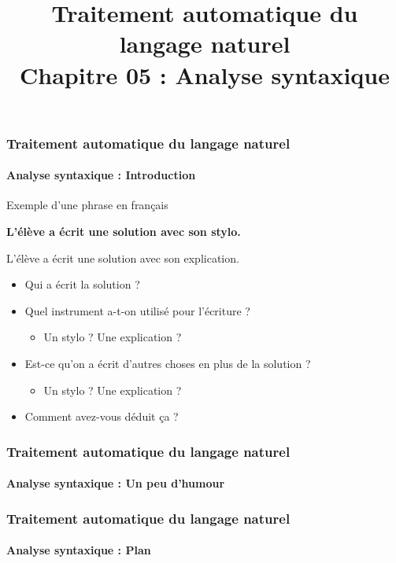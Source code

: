 \documentclass[xcolor=table]{beamer}
\title[TALN : 05- Analyse syntaxique]%
{Traitement automatique du langage naturel\\Chapitre 05 : Analyse syntaxique}
\begin{document}
	
\begin{frame}
\frametitle{Traitement automatique du langage naturel}
\framesubtitle{Analyse syntaxique : Introduction}

\begin{exampleblock}{Exemple d'une phrase en français}
	\begin{center}
		\Large\bfseries
		L'élève a écrit une solution avec son stylo. 
		
		L'élève a écrit une solution avec son explication.
	\end{center}
\end{exampleblock}

\begin{itemize}
	\item Qui a écrit la solution ?
	\item Quel instrument a-t-on utilisé pour l'écriture ?
	\begin{itemize}
		\item Un stylo ? Une explication ?
	\end{itemize}
	\item Est-ce qu'on a écrit d'autres choses en plus de la solution ?
	\begin{itemize}
		\item Un stylo ? Une explication ?
	\end{itemize}
	\item Comment avez-vous déduit ça ?
\end{itemize}

\end{frame}

\begin{frame}
\frametitle{Traitement automatique du langage naturel}
\framesubtitle{Analyse syntaxique : Un peu d'humour}

\begin{center}
\end{center}

\end{frame}

\begin{frame}
\frametitle{Traitement automatique du langage naturel}
\framesubtitle{Analyse syntaxique : Plan}

\begin{multicols}{2}
\tableofcontents
\end{multicols}
\end{frame}

\end{document}

